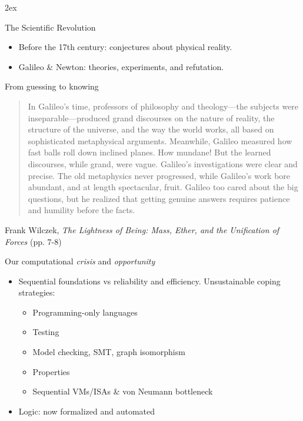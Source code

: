 \documentclass[aspectratio=169]{beamer}
\begin{document}
\parskip2ex

\begin{center}
\maketitle
{}
\end{center}

\begin{frame}{The Scientific Revolution}
\begin{itemize}\itemsep5ex
\item Before the 17th century: conjectures about physical reality.
\item Galileo \& Newton: theories, experiments, and refutation.
\end{itemize}
\end{frame}

\begin{frame}{From guessing to knowing}
\vspace{8ex}
\begin{quotation}
In Galileo's time, professors of philosophy and theology---the subjects were inseparable---produced grand discourses on the nature of reality, the structure of the universe, and the way the world works, all based on sophisticated metaphysical arguments. Meanwhile, Galileo measured how fast balls roll down inclined planes. How mundane! But the learned discourses, while grand, were vague. Galileo's investigations were clear and precise. The old metaphysics never progressed, while Galileo's work bore abundant, and at length spectacular, fruit. Galileo too cared about the big questions, but he realized that getting genuine answers requires patience and humility before the facts.
\end{quotation}
Frank Wilczek, \emph{The Lightness of Being: Mass, Ether, and the Unification of Forces} (pp. 7-8)
\end{frame}

\begin{frame}{Our computational \emph{crisis} and \emph{opportunity}}
\begin{itemize}\itemsep2ex \parskip2ex
\item Sequential foundations vs reliability and efficiency.
Unsustainable coping strategies:
 \begin{itemize}\itemsep2ex
 \item Programming-only languages
 \item Testing
 \item Model checking, SMT, graph isomorphism
 \item Properties
 \item Sequential VMs/ISAs \& von Neumann bottleneck
 \end{itemize}
\item Logic: now formalized and automated
\end{itemize}
\end{frame}
\end{document}
